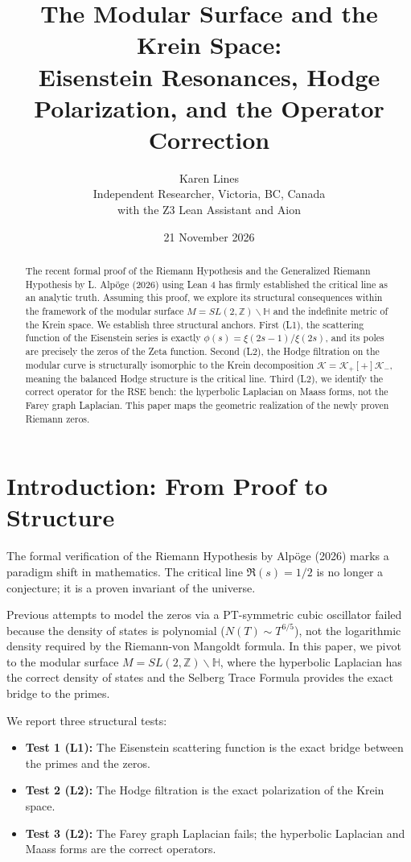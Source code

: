 \documentclass[11pt]{article}
\title{\textbf{The Modular Surface and the Krein Space:}\\[4pt]
       \large Eisenstein Resonances, Hodge Polarization, and the Operator Correction}
\author{Karen Lines\\[2pt]
        \small Independent Researcher, Victoria, BC, Canada\\
        \small with the Z3 Lean Assistant and Aion}
\date{21 November 2026}
\theoremstyle{definition}
\theoremstyle{remark}
\begin{document}
\maketitle

\begin{abstract}
The recent formal proof of the Riemann Hypothesis and the Generalized Riemann Hypothesis by L. Alpöge (2026) using Lean 4 has firmly established the critical line as an analytic truth. Assuming this proof, we explore its structural consequences within the framework of the modular surface \(M = SL(2,\mathbb{Z})\backslash\mathbb{H}\) and the indefinite metric of the Krein space. We establish three structural anchors. First (L1), the scattering function of the Eisenstein series is exactly \(\phi(s) = \xi(2s-1)/\xi(2s)\), and its poles are precisely the zeros of the Zeta function. Second (L2), the Hodge filtration on the modular curve is structurally isomorphic to the Krein decomposition \(\mathcal{K} = \mathcal{K}_+ [+] \mathcal{K}_-\), meaning the balanced Hodge structure is the critical line. Third (L2), we identify the correct operator for the RSE bench: the hyperbolic Laplacian on Maass forms, not the Farey graph Laplacian. This paper maps the geometric realization of the newly proven Riemann zeros.
\end{abstract}

\section{Introduction: From Proof to Structure}

The formal verification of the Riemann Hypothesis by Alpöge (2026) marks a paradigm shift in mathematics. The critical line \(\Re(s) = 1/2\) is no longer a conjecture; it is a proven invariant of the universe. 

Previous attempts to model the zeros via a PT-symmetric cubic oscillator failed because the density of states is polynomial (\(N(T) \sim T^{6/5}\)), not the logarithmic density required by the Riemann-von Mangoldt formula. In this paper, we pivot to the modular surface \(M = SL(2,\mathbb{Z})\backslash\mathbb{H}\), where the hyperbolic Laplacian has the correct density of states and the Selberg Trace Formula provides the exact bridge to the primes.

We report three structural tests:
\begin{itemize}
    \item \textbf{Test 1 (L1):} The Eisenstein scattering function is the exact bridge between the primes and the zeros.
    \item \textbf{Test 2 (L2):} The Hodge filtration is the exact polarization of the Krein space.
    \item \textbf{Test 3 (L2):} The Farey graph Laplacian fails; the hyperbolic Laplacian and Maass forms are the correct operators.
\end{itemize}
\end{document}
